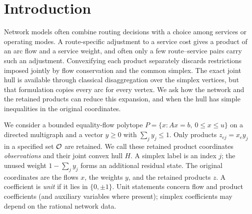 \section{Introduction}\label{sec:introduction}
Network models often combine routing decisions with a choice among services
or operating modes. A route-specific adjustment to a service cost gives a
product of an arc flow and a service weight, and often only a few
route--service pairs carry such an adjustment. Convexifying each product
separately discards restrictions imposed jointly by flow conservation and
the common simplex. The exact joint hull is available through classical
disaggregation over the simplex vertices, but that formulation copies every
arc for every vertex. We ask how the network and the retained products can
reduce this expansion, and when the hull has simple inequalities in the
original coordinates.

We consider a bounded equality-flow polytope
$P=\{x:Ax=b,\ 0\le x\le u\}$ on a directed multigraph and a vector
$y\ge0$ with $\sum_jy_j\le1$. Only products $z_{ej}=x_e y_j$ in a
specified set $\mathcal O$ are retained. We call these retained product
coordinates \emph{observations} and their joint convex hull $H$. A simplex
label is an index $j$; the unused weight $1-\sum_jy_j$ forms an additional
residual state. The original coordinates are the flows $x$, the weights $y$,
and the retained products $z$. A coefficient is \emph{unit} if it lies in
$\{0,\pm1\}$. Unit statements concern flow and product coefficients (and
auxiliary variables where present); simplex coefficients may depend on the
rational network data.

